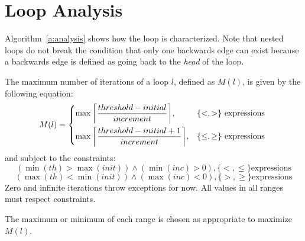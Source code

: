 \section{Loop Analysis}

Algorithm~\ref{a:analysis} shows how the loop is characterized. Note that nested loops do not break the condition that only one backwards edge can exist because a backwards edge is defined as going back to the \textit{head} of the loop. 

The maximum number of iterations of a loop $l$, defined as $M(l)$, is given by the following equation:
\begin{equation}
	M(l) = 
	\begin{dcases*}
		\max{\left \lceil \frac{threshold - initial}{increment} \right \rceil}, & $\{<,>\}$ expressions \\
		\max{\left \lceil \frac{threshold - initial + 1}{increment} \right \rceil}, & $\{\leq,\geq\}$ expressions
	\end{dcases*}
	\label{eq:max}
\end{equation}
and subject to the constraints:
\begin{equation}
(\min(th) > \max(init)) \wedge (\min(inc) > 0), \{<,\leq\} \text{expressions} 
\end{equation}
\begin{equation}
(\max(th) < \min(init)) \wedge (\max(inc) < 0), \{>,\geq\} \text{expressions} 
\end{equation}
Zero and infinite iterations throw exceptions for now. All values in all ranges must respect constraints.
		
The maximum or minimum of each range is chosen as appropriate to maximize $M(l)$.	

